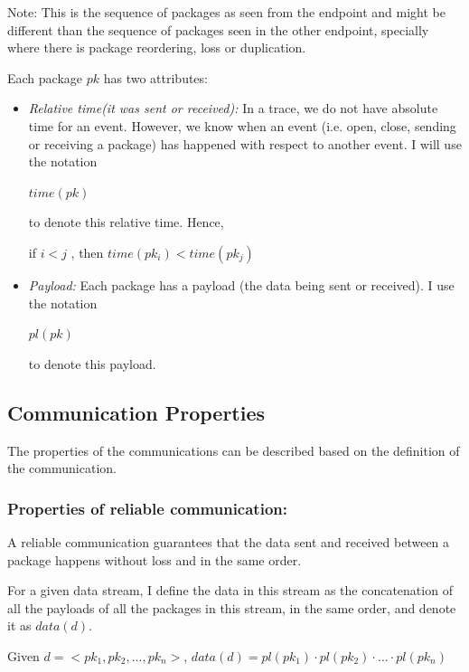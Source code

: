 Note: This is the sequence of packages as seen from the endpoint and might be different than the sequence of packages seen in the other endpoint, specially where there is package reordering, loss or duplication.

Each package $pk$ has two attributes:
\begin{itemize}
\item \textit{Relative time(it was sent or received):} In a trace, we do not have absolute time for an event. However, we know when an event (i.e. open, close, sending or receiving a package) has happened with respect to another event. I will use the notation 

$time(pk)$

to denote this relative time. Hence, 

if  $i < j $ , then  $time(pk_i) < time(pk_j)$

\item \textit{Payload:} Each package has a payload (the data being sent or received). I use the notation 

$pl(pk)$ 

to denote this payload. 

\end{itemize}


\subsection{Communication Properties}\label{properties}
The properties of the communications can be described based on the definition of the communication.

\subsubsection{Properties of reliable communication:}\label{reliablepro}
A reliable communication guarantees that the data sent and received between a package happens without loss and in the same order.

For a given data stream, I define the data in this stream as the concatenation of all the payloads of all the packages in this stream, in the same order, and denote it as $data(d)$.

Given $ d = <pk_1, pk_2, ..., pk_n>$, $data(d) = pl(pk_1) \cdot pl(pk_2)\cdot \ldots \cdot pl(pk_n)$

